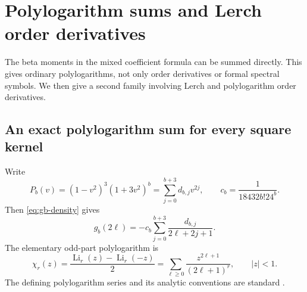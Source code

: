 \documentclass[11pt]{article}
\numberwithin{equation}{section}
\theoremstyle{definition}\newtheorem{definition}[theorem]{Definition}
\theoremstyle{remark}\newtheorem{remark}[theorem]{Remark}
\newcommand{\Li}{\operatorname{Li}}
\begin{document}

\section{Polylogarithm sums and Lerch order derivatives}
\label{sec:polylog}

The beta moments in the mixed coefficient formula can be summed directly.
This gives ordinary polylogarithms, not only order derivatives or formal
spectral symbols. We then give a second family involving Lerch and
polylogarithm order derivatives.

\subsection{An exact polylogarithm sum for every square kernel}
Write
\begin{equation}\label{eq:Pbcoeff}
 P_b(v)=(1-v^2)^3(1+3v^2)^b
       =\sum_{j=0}^{b+3}d_{b,j}v^{2j},
 \qquad c_b=\frac1{18432b!24^b}.
\end{equation}
Then \eqref{eq:gb-density} gives
\begin{equation}\label{eq:gb-rational}
 g_b(2\ell)=-c_b\sum_{j=0}^{b+3}\frac{d_{b,j}}{2\ell+2j+1}.
\end{equation}
The elementary odd-part polylogarithm is
\[
 \chi_r(z)=\frac{\Li_r(z)-\Li_r(-z)}2
 =\sum_{\ell\ge0}\frac{z^{2\ell+1}}{(2\ell+1)^r},\qquad |z|<1.
\]
The defining polylogarithm series and its analytic conventions are
standard \cite{DLMF12}.
\end{document}
